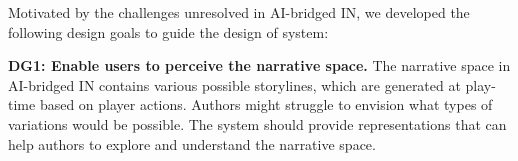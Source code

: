 Motivated by the challenges unresolved in AI-bridged IN, we developed the following design goals to guide the design of system:

\textbf{DG1: Enable users to perceive the narrative space.} 
The narrative space in AI-bridged IN contains various possible storylines, which are generated at play-time based on player actions. Authors might struggle to envision what types of variations would be possible. The system should provide representations that can help authors to explore and understand the narrative space. 



